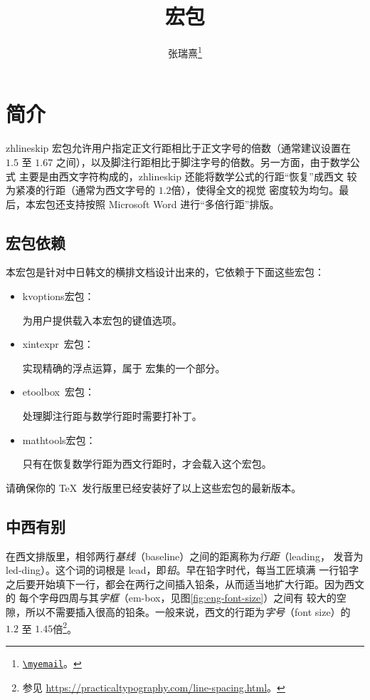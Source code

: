 \documentclass[zihao=5,a4paper]{ctexart}
\title{\vspace*{-26bp}\pkg{zhlineskip} 宏包}
\author{张瑞熹\thanks{\href{mailto:\myemail}{\nolinkurl{\myemail}}。}}
\date{2019/05/15\hskip\ccwd\relax v1.0e}
\newcommand\pkg[1]{{\ttfamily#1}}
\newcommand*\packagedependency[1]{%
  \mbox{\pkg{#1}\CJKecglue 宏包：}\ignorespaces
}
\begin{document}
\maketitle

\tableofcontents

\section{简介}

\pkg{zhlineskip} 宏包允许用户指定正文行距相比于正文字号的倍数（通常建议设置在
$1.5$ 至 $1.67$ 之间），以及脚注行距相比于脚注字号的倍数。另一方面，由于数学公式
主要是由西文字符构成的，\pkg{zhlineskip} 还能将数学公式的行距“恢复”成西文
较为紧凑的行距（通常为西文字号的 $1.2$\nobreak\CJKecglue 倍），使得全文的视觉
密度较为均匀。最后，本宏包还支持按照 Microsoft Word 进行“多倍行距”排版。

\subsection{宏包依赖}

本宏包是针对中日韩文的横排文档设计出来的，它依赖于下面这些宏包：
\begin{itemize}
\item \packagedependency{kvoptions}
为用户提供载入本宏包的键值选项。
\item \packagedependency{xintexpr~}
实现精确的浮点运算，属于\CJKecglue\pkg{xint} 宏集的一个部分。
\item \packagedependency{etoolbox~}
处理脚注行距与数学行距时需要打补丁。
\item \packagedependency{mathtools}
只有在恢复数学行距为西文行距时，才会载入这个宏包。
\end{itemize}
请确保你的 \TeX\ 发行版里已经安装好了以上这些宏包的最新版本。

\subsection{中西有别}

在西文排版里，相邻两行\emph{基线}（baseline）之间的距离称为\emph{行距}（leading，
发音为 led-ding）。这个词的词根是 lead，即\emph{铅}。早在铅字时代，每当工匠填满
一行铅字之后要开始填下一行，都会在两行之间插入铅条，从而适当地扩大行距。因为西文的
每个字母四周与其\emph{字框}（em-box，见图\nobreak\CJKecglue\ref{fig:eng-font-size}）之间有
较大的空隙，所以不需要插入很高的铅条。一般来说，西文的行距为\emph{字号}（font
size）的 $1.2$ 至 $1.45$\nobreak\CJKecglue 倍\footnote{参见
\url{https://practicaltypography.com/line-spacing.html}。}。
\end{document}
